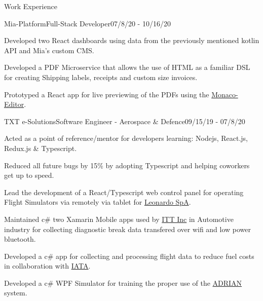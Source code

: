 \documentclass{article}
\newlength{\tabin}
\newlength{\secsep}
\newcommand{\lineunder}{\vspace*{-8pt} \\ \hspace*{-6pt} \hrulefill \\ \vspace*{-15pt}}
\newenvironment{tabbedsection}[1]{
  \begin{list}{}{
      \setlength{\itemsep}{0pt}
      \setlength{\labelsep}{0pt}
      \setlength{\labelwidth}{0pt}
      \setlength{\leftmargin}{\tabin}
      \setlength{\rightmargin}{\tabin}
      \setlength{\listparindent}{0pt}
      \setlength{\parsep}{0pt}
      \setlength{\parskip}{0pt}
      \setlength{\partopsep}{0pt}
      \setlength{\topsep}{#1}
    }
  \item[]
}{\end{list}}
\newenvironment{resume_section}[1]{
  \filbreak
  \vspace{2\secsep}
  \textsc{\large#1}
  \lineunder
  \begin{tabbedsection}{\secsep}
}{\end{tabbedsection}}
\newenvironment{subitems}{
  \renewcommand{\labelitemi}{-}
  \begin{itemize}
      \setlength{\labelsep}{1em}
}{\end{itemize}}
\newenvironment{resume_employer}[4]{
  \vspace{\secsep}
  \textbf{#1} \\ 
  \indent {\small #2} \hfill {\footnotesize#3 (#4)}

}
\newenvironment{resume_work_bullets}{
  \begin{tabbedsection}{0pt}
  \begin{subitems}
}{\end{subitems}\end{tabbedsection}}
\begin{document}
\begin{resume_section}{Work Experience}
\begin{resume_employer}{Mia-Platform}{Full-Stack Developer}{}{07/8/20 - 10/16/20}
\begin{resume_work_bullets}
          \item Developed two React dashboards using data from the previously mentioned kotlin API and Mia's custom CMS.
          \item Developed a PDF Microservice that allows the use of HTML as a familiar DSL for creating Shipping labels, receipts and custom size invoices.
          \item Prototyped a React app for live previewing of the PDFs using the \href{https://github.com/microsoft/monaco-editor}{Monaco-Editor}.
      \end{resume_work_bullets}
    \end{resume_employer}
    \begin{resume_employer}{TXT e-Solutions}{Software Engineer - Aerospace \& Defence}{}{09/15/19 - 07/8/20}
      \begin{resume_work_bullets}
          \item Acted as a point of reference/mentor for developers learning: Nodejs, React.js, Redux.js \& Typescript.
          \item Reduced all future bugs by 15\% by adopting Typescript and helping coworkers get up to speed.
          \item Lead the development of a React/Typescript web control panel for operating Flight Simulators via remotely via tablet for \href{https://www.leonardocompany.com/en/home}{Leonardo SpA}.
          \item Maintained c\# two Xamarin Mobile apps used by \href {https://www.itt.com/home}{ITT Inc} in Automotive industry for collecting diagnostic break data transfered over wifi and low power bluetooth.
          \item Developed a c\# app for collecting and processing flight data to reduce fuel costs in collaboration with \href{http://pace.txtgroup.com/products/flight-operations/pacelab-flight-profile-optimizer/}{IATA}.
          \item Developed a c\# WPF Simulator for training the proper use of the \href{https://www.elt-roma.com/product/adrian}{ADRIAN} system.
      \end{resume_work_bullets}
    \end{resume_employer}
    
  \end{resume_section}
\end{document}
